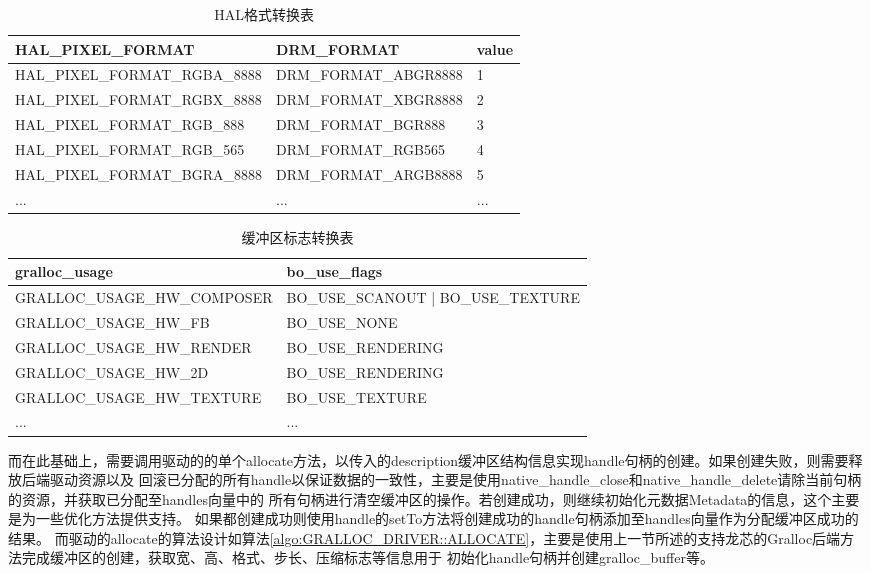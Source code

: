 \begin{table}[h]
  \centering
  \caption{HAL格式转换表}
  \label{tab:HAL格式转换表}
  \begin{tabular}{lll}
    \toprule
    HAL\_PIXEL\_FORMAT & DRM\_FORMAT  & value\\
    \midrule
    HAL\_PIXEL\_FORMAT\_RGBA\_8888 & DRM\_FORMAT\_ABGR8888 & 1\\
    HAL\_PIXEL\_FORMAT\_RGBX\_8888 & DRM\_FORMAT\_XBGR8888 & 2\\
    HAL\_PIXEL\_FORMAT\_RGB\_888 & DRM\_FORMAT\_BGR888 & 3\\
    HAL\_PIXEL\_FORMAT\_RGB\_565 & DRM\_FORMAT\_RGB565 & 4\\
    HAL\_PIXEL\_FORMAT\_BGRA\_8888 & DRM\_FORMAT\_ARGB8888 & 5\\
    ... & ...&...\\ 
    \bottomrule
  \end{tabular}
  \note{}
\end{table}

\begin{table}[h]
  \centering
  \caption{缓冲区标志转换表}
  \label{tab:缓冲区标志转换表}
  \begin{tabular}{ll}
    \toprule
    gralloc\_usage & bo\_use\_flags \\
    \midrule
    GRALLOC\_USAGE\_HW\_COMPOSER & BO\_USE\_SCANOUT | BO\_USE\_TEXTURE \\
    GRALLOC\_USAGE\_HW\_FB & BO\_USE\_NONE \\
    GRALLOC\_USAGE\_HW\_RENDER & BO\_USE\_RENDERING \\
    GRALLOC\_USAGE\_HW\_2D & BO\_USE\_RENDERING \\
    GRALLOC\_USAGE\_HW\_TEXTURE & BO\_USE\_TEXTURE \\
    ... & ...\\ 
    \bottomrule
  \end{tabular}
  \note{}
\end{table}

而在此基础上，需要调用驱动的的单个allocate方法，以传入的description缓冲区结构信息实现handle句柄的创建。如果创建失败，则需要释放后端驱动资源以及
回滚已分配的所有handle以保证数据的一致性，主要是使用native\_handle\_close和native\_handle\_delete请除当前句柄的资源，并获取已分配至handles向量中的
所有句柄进行清空缓冲区的操作。若创建成功，则继续初始化元数据Metadata的信息，这个主要是为一些优化方法提供支持。
如果都创建成功则使用handle的setTo方法将创建成功的handle句柄添加至handles向量作为分配缓冲区成功的结果。
而驱动的allocate的算法设计如算法\ref{algo:GRALLOC_DRIVER::ALLOCATE}，主要是使用上一节所述的支持龙芯的Gralloc后端方法完成缓冲区的创建，获取宽、高、格式、步长、压缩标志等信息用于
初始化handle句柄并创建gralloc\_buffer等。

